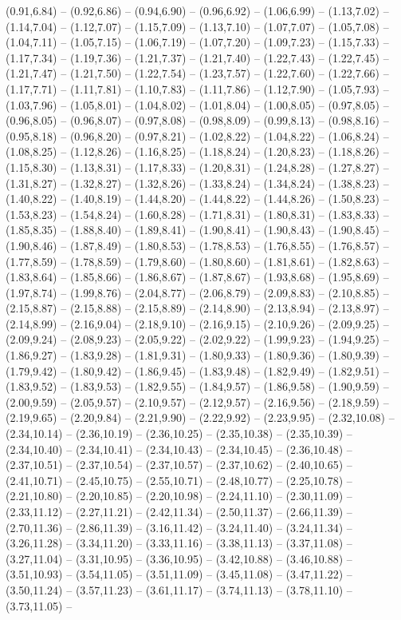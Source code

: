 {(0.91,6.84) -- (0.92,6.86) -- (0.94,6.90) -- (0.96,6.92) -- (1.06,6.99) -- (1.13,7.02) -- (1.14,7.04) -- (1.12,7.07) -- (1.15,7.09) -- (1.13,7.10) -- (1.07,7.07) -- (1.05,7.08) -- (1.04,7.11) -- (1.05,7.15) -- (1.06,7.19) -- (1.07,7.20) -- (1.09,7.23) -- (1.15,7.33) -- (1.17,7.34) -- (1.19,7.36) -- (1.21,7.37) -- (1.21,7.40) -- (1.22,7.43) -- (1.22,7.45) -- (1.21,7.47) -- (1.21,7.50) -- (1.22,7.54) -- (1.23,7.57) -- (1.22,7.60) -- (1.22,7.66) -- (1.17,7.71) -- (1.11,7.81) -- (1.10,7.83) -- (1.11,7.86) -- (1.12,7.90) -- (1.05,7.93) -- (1.03,7.96) -- (1.05,8.01) -- (1.04,8.02) -- (1.01,8.04) -- (1.00,8.05) -- (0.97,8.05) -- (0.96,8.05) -- (0.96,8.07) -- (0.97,8.08) -- (0.98,8.09) -- (0.99,8.13) -- (0.98,8.16) -- (0.95,8.18) -- (0.96,8.20) -- (0.97,8.21) -- (1.02,8.22) -- (1.04,8.22) -- (1.06,8.24) -- (1.08,8.25) -- (1.12,8.26) -- (1.16,8.25) -- (1.18,8.24) -- (1.20,8.23) -- (1.18,8.26) -- (1.15,8.30) -- (1.13,8.31) -- (1.17,8.33) -- (1.20,8.31) -- (1.24,8.28) -- (1.27,8.27) -- (1.31,8.27) -- (1.32,8.27) -- (1.32,8.26) -- (1.33,8.24) -- (1.34,8.24) -- (1.38,8.23) -- (1.40,8.22) -- (1.40,8.19) -- (1.44,8.20) -- (1.44,8.22) -- (1.44,8.26) -- (1.50,8.23) -- (1.53,8.23) -- (1.54,8.24) -- (1.60,8.28) -- (1.71,8.31) -- (1.80,8.31) -- (1.83,8.33) -- (1.85,8.35) -- (1.88,8.40) -- (1.89,8.41) -- (1.90,8.41) -- (1.90,8.43) -- (1.90,8.45) -- (1.90,8.46) -- (1.87,8.49) -- (1.80,8.53) -- (1.78,8.53) -- (1.76,8.55) -- (1.76,8.57) -- (1.77,8.59) -- (1.78,8.59) -- (1.79,8.60) -- (1.80,8.60) -- (1.81,8.61) -- (1.82,8.63) -- (1.83,8.64) -- (1.85,8.66) -- (1.86,8.67) -- (1.87,8.67) -- (1.93,8.68) -- (1.95,8.69) -- (1.97,8.74) -- (1.99,8.76) -- (2.04,8.77) -- (2.06,8.79) -- (2.09,8.83) -- (2.10,8.85) -- (2.15,8.87) -- (2.15,8.88) -- (2.15,8.89) -- (2.14,8.90) -- (2.13,8.94) -- (2.13,8.97) -- (2.14,8.99) -- (2.16,9.04) -- (2.18,9.10) -- (2.16,9.15) -- (2.10,9.26) -- (2.09,9.25) -- (2.09,9.24) -- (2.08,9.23) -- (2.05,9.22) -- (2.02,9.22) -- (1.99,9.23) -- (1.94,9.25) -- (1.86,9.27) -- (1.83,9.28) -- (1.81,9.31) -- (1.80,9.33) -- (1.80,9.36) -- (1.80,9.39) -- (1.79,9.42) -- (1.80,9.42) -- (1.86,9.45) -- (1.83,9.48) -- (1.82,9.49) -- (1.82,9.51) -- (1.83,9.52) -- (1.83,9.53) -- (1.82,9.55) -- (1.84,9.57) -- (1.86,9.58) -- (1.90,9.59) -- (2.00,9.59) -- (2.05,9.57) -- (2.10,9.57) -- (2.12,9.57) -- (2.16,9.56) -- (2.18,9.59) -- (2.19,9.65) -- (2.20,9.84) -- (2.21,9.90) -- (2.22,9.92) -- (2.23,9.95) -- (2.32,10.08) -- (2.34,10.14) -- (2.36,10.19) -- (2.36,10.25) -- (2.35,10.38) -- (2.35,10.39) -- (2.34,10.40) -- (2.34,10.41) -- (2.34,10.43) -- (2.34,10.45) -- (2.36,10.48) -- (2.37,10.51) -- (2.37,10.54) -- (2.37,10.57) -- (2.37,10.62) -- (2.40,10.65) -- (2.41,10.71) -- (2.45,10.75) -- (2.55,10.71) -- (2.48,10.77) -- (2.25,10.78) -- (2.21,10.80) -- (2.20,10.85) -- (2.20,10.98) -- (2.24,11.10) -- (2.30,11.09) -- (2.33,11.12) -- (2.27,11.21) -- (2.42,11.34) -- (2.50,11.37) -- (2.66,11.39) -- (2.70,11.36) -- (2.86,11.39) -- (3.16,11.42) -- (3.24,11.40) -- (3.24,11.34) -- (3.26,11.28) -- (3.34,11.20) -- (3.33,11.16) -- (3.38,11.13) -- (3.37,11.08) -- (3.27,11.04) -- (3.31,10.95) -- (3.36,10.95) -- (3.42,10.88) -- (3.46,10.88) -- (3.51,10.93) -- (3.54,11.05) -- (3.51,11.09) -- (3.45,11.08) -- (3.47,11.22) -- (3.50,11.24) -- (3.57,11.23) -- (3.61,11.17) -- (3.74,11.13) -- (3.78,11.10) -- (3.73,11.05) -- }
